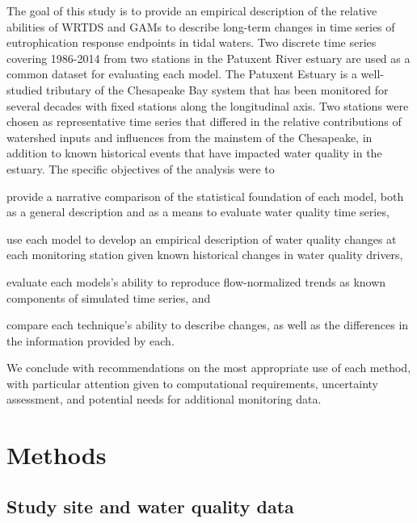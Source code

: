 \documentclass{svjour3}\usepackage[]{graphicx}\usepackage[]{color}
\begin{document}
The goal of this study is to provide an empirical description of the relative abilities of \ac{WRTDS} and \acp{GAM} to describe long-term changes in time series of eutrophication response endpoints in tidal waters.  Two discrete time series covering 1986-2014 from two stations in the Patuxent River estuary are used as a common dataset for evaluating each model.  The Patuxent Estuary is a well-studied tributary of the Chesapeake Bay system that has been monitored for several decades with fixed stations along the longitudinal axis.  Two stations were chosen as representative time series that differed in the relative contributions of watershed inputs and influences from the mainstem of the Chesapeake, in addition to known historical events that have impacted water quality in the estuary.  The specific objectives of the analysis were to \begin{inparaenum}[1\upshape)]
\item provide a narrative comparison of the statistical foundation of each model, both as a general description and as a means to evaluate water quality time series,
\item use each model to develop an empirical description of water quality changes at each monitoring station given known historical changes in water quality drivers,
\item evaluate each models's ability to reproduce flow-normalized trends as known components of simulated time series, and
\item compare each technique's ability to describe changes, as well as the differences in the information provided by each. 
\end{inparaenum}
We conclude with recommendations on the most appropriate use of each method, with particular attention given to computational requirements, uncertainty assessment, and potential needs for additional monitoring data.

\section{Methods}

\subsection{Study site and water quality data}

\end{document}
